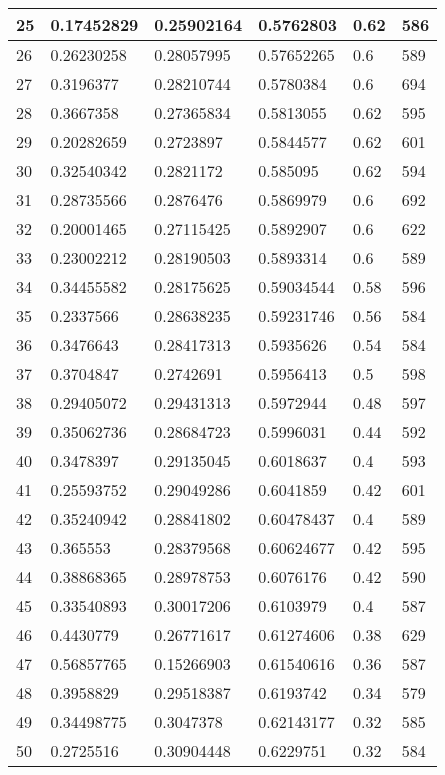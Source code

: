 \begin{longtable}{|l|l|l|l|l|l|}
25 & 0.17452829 & 0.25902164 & 0.5762803 & 0.62 & 586 \\ \hline 
26 & 0.26230258 & 0.28057995 & 0.57652265 & 0.6 & 589 \\ \hline 
27 & 0.3196377 & 0.28210744 & 0.5780384 & 0.6 & 694 \\ \hline 
28 & 0.3667358 & 0.27365834 & 0.5813055 & 0.62 & 595 \\ \hline 
29 & 0.20282659 & 0.2723897 & 0.5844577 & 0.62 & 601 \\ \hline 
30 & 0.32540342 & 0.2821172 & 0.585095 & 0.62 & 594 \\ \hline 
31 & 0.28735566 & 0.2876476 & 0.5869979 & 0.6 & 692 \\ \hline 
32 & 0.20001465 & 0.27115425 & 0.5892907 & 0.6 & 622 \\ \hline 
33 & 0.23002212 & 0.28190503 & 0.5893314 & 0.6 & 589 \\ \hline 
34 & 0.34455582 & 0.28175625 & 0.59034544 & 0.58 & 596 \\ \hline 
35 & 0.2337566 & 0.28638235 & 0.59231746 & 0.56 & 584 \\ \hline 
36 & 0.3476643 & 0.28417313 & 0.5935626 & 0.54 & 584 \\ \hline 
37 & 0.3704847 & 0.2742691 & 0.5956413 & 0.5 & 598 \\ \hline 
38 & 0.29405072 & 0.29431313 & 0.5972944 & 0.48 & 597 \\ \hline 
39 & 0.35062736 & 0.28684723 & 0.5996031 & 0.44 & 592 \\ \hline 
40 & 0.3478397 & 0.29135045 & 0.6018637 & 0.4 & 593 \\ \hline 
41 & 0.25593752 & 0.29049286 & 0.6041859 & 0.42 & 601 \\ \hline 
42 & 0.35240942 & 0.28841802 & 0.60478437 & 0.4 & 589 \\ \hline 
43 & 0.365553 & 0.28379568 & 0.60624677 & 0.42 & 595 \\ \hline 
44 & 0.38868365 & 0.28978753 & 0.6076176 & 0.42 & 590 \\ \hline 
45 & 0.33540893 & 0.30017206 & 0.6103979 & 0.4 & 587 \\ \hline 
46 & 0.4430779 & 0.26771617 & 0.61274606 & 0.38 & 629 \\ \hline 
47 & 0.56857765 & 0.15266903 & 0.61540616 & 0.36 & 587 \\ \hline 
48 & 0.3958829 & 0.29518387 & 0.6193742 & 0.34 & 579 \\ \hline 
49 & 0.34498775 & 0.3047378 & 0.62143177 & 0.32 & 585 \\ \hline 
50 & 0.2725516 & 0.30904448 & 0.6229751 & 0.32 & 584 \\ \hline 
\end{longtable}